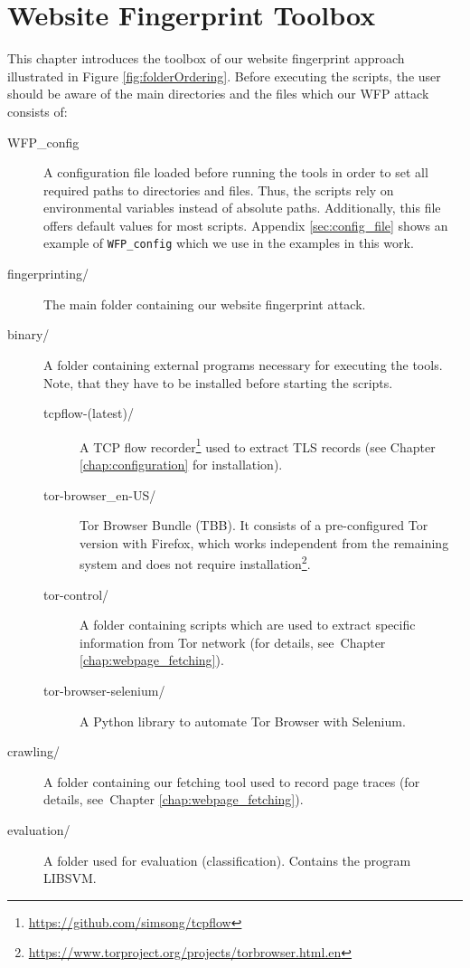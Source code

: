 \chapter{Website Fingerprint Toolbox}
\label{chap:folder_organization}

This chapter introduces the toolbox of our website fingerprint approach illustrated in Figure \ref{fig:folderOrdering}. Before executing the scripts, the user should be aware of the main directories and the files which our \ac{WFP} attack consists of:

\begin{description}
\item[WFP\_config] A configuration file loaded before running the tools in order to set all required paths to directories and files. Thus, the scripts rely on environmental variables instead of absolute paths. Additionally, this file offers default values for most scripts. Appendix \ref{sec:config_file} shows an example of \texttt{WFP\_config} which we use in the examples in this work.
\item[fingerprinting/] The main folder containing our website fingerprint attack.
\item[binary/] A folder containing external programs necessary for executing the tools. Note, that they have to be installed before starting the scripts.
\begin{description}
\item[tcpflow-(latest)/] A \ac{TCP} flow recorder\footnote{\url{https://github.com/simsong/tcpflow}} used to extract \ac{TLS} records (see Chapter \ref{chap:configuration} for installation).
\item[tor-browser\_en-US/] Tor Browser Bundle (\acs{TBB}). It consists of a pre-configured Tor version with Firefox, which works independent from the remaining system and does not require installation\footnote{\url{https://www.torproject.org/projects/torbrowser.html.en}}.
\item[tor-control/] A folder containing scripts which are used to extract specific information from Tor network (for details, see~Chapter \ref{chap:webpage_fetching}).
\item[tor-browser-selenium/] A Python library to automate Tor Browser with Selenium.
\end{description}
\item[crawling/] A folder containing our fetching tool used to record page traces (for details, see~Chapter \ref{chap:webpage_fetching}).
\item[evaluation/] A folder used for evaluation (classification). Contains the program LIBSVM.

\end{description}
